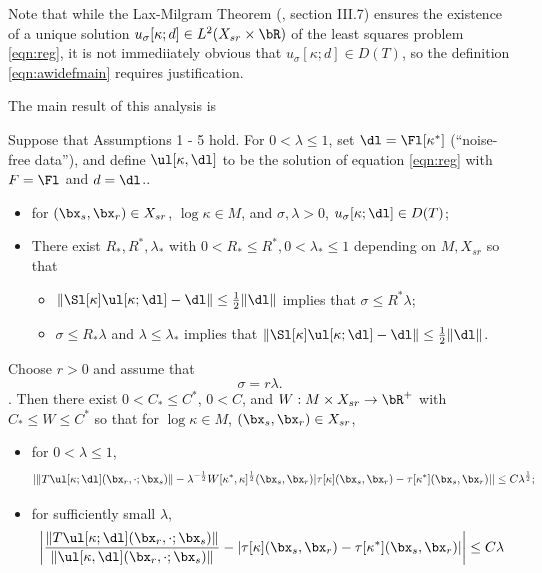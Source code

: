 Note that while the Lax-Milgram Theorem (\cite{Yosida}, section
III.7) ensures the existence of a unique solution
$u_{\sigma}[\kappa;d] \in L^2(X_{sr}\times \bR)$ of the least squares
problem \ref{eqn:reg},
it is not immediiately obvious that $u_{\sigma}[\kappa;d] \in D(T)$,
so the definition \ref{eqn:awidefmain} requires justification.

The main result of this analysis is

\begin{theorem}
  \label{thm:main}
  Suppose that Assumptions 1 - 5 hold. For $0 <
  \lambda \le 1$, set
  $\dl=\Fl[\kappa^*]$ (``noise-free data''), and  define $\ul[\kappa,\dl]$
  to be the solution of 
  equation \ref{eqn:reg} with $F=\Fl$ and $d=\dl$..
  
  \begin{itemize}
  \item[1. ] for $(\bx_s,\bx_r) \in X_{sr}$, $\log \kappa \in M$, and
    $\sigma, \lambda >0$, $u_{\sigma}[\kappa;\dl] \in
    D(T)$;
  \item[2. ] There exist $R_*,R^*,\lambda_*$ with $0<R_*\le R^*, 0 <
    \lambda_*\le 1$ depending on
    $M, X_{sr}$ so that
    \begin{itemize}
    \item[a. ] $\|\Sl[\kappa]\ul[\kappa;\dl]-\dl\| \le
      \frac{1}{2}\|\dl\|$ implies that $\sigma \le R^*\lambda$;
    \item[b. ] $\sigma \le R_*\lambda$ and $\lambda \le \lambda_*$
      implies that $\|\Sl[\kappa]\ul[\kappa;\dl]-\dl\| \le
      \frac{1}{2}\|\dl\|$.
    \end{itemize}
  \end{itemize}
  Choose $r > 0$ and assume that
  \begin{equation}
    \label{eqn:lamsig}
    \sigma = r \lambda.
  \end{equation}.
  Then there exist $0 < C_* \le C^*$, $0 < C$, and $W: M \times X_{sr}
  \rightarrow \bR^+$ with $C_* \le
  W \le C^*$ so that for
  $\log \kappa \in M$, $(\bx_s,\bx_r) \in X_{sr}$,
  \begin{itemize}
  \item[3. ] for $0 <  \lambda \le 1$, 
    \begin{equation}
      \label{eqn:mswitt}
      |\|T\ul[\kappa;\dl](\bx_r,\cdot;\bx_s)\|- \lambda^{-\frac{1}{2}} W[\kappa^*,\kappa]^{\frac{1}{2}}(\bx_s,\bx_r)|\tau[\kappa](\bx_s,\bx_r)-\tau[\kappa^*](\bx_s,\bx_r)|| \le C
      \lambda^{\frac{1}{2}};
    \end{equation}
  \item[4. ]for sufficiently small $\lambda$, 
    \begin{equation}
      \label{eqn:awitt}
      \left|\frac{\|T\ul[\kappa;\dl](\bx_r,\cdot;\bx_s)\|}{\|\ul[\kappa,\dl](\bx_r,\cdot;\bx_s)\|}-
        |\tau[\kappa](\bx_s,\bx_r)-\tau[\kappa^*](\bx_s,\bx_r)|\right| \le C \lambda
    \end{equation}
  \end{itemize}
\end{theorem}
